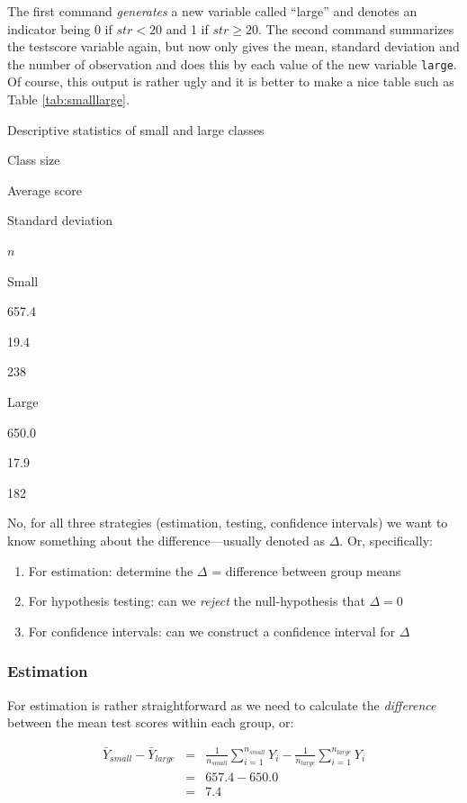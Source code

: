 \documentclass[
]{book}
\providecommand{\tightlist}{%
  \setlength{\itemsep}{0pt}\setlength{\parskip}{0pt}}
\begin{document}
The first command \emph{generates} a new variable called ``large'' and denotes an indicator being 0 if \(str < 20\) and 1 if \(str \geq 20\). The second command summarizes the testscore variable again, but now only gives the mean, standard deviation and the number of observation and does this by each value of the new variable \texttt{large}. Of course, this output is rather ugly and it is better to make a nice table such as Table \ref{tab:smalllarge}.

\label{tab:smalllarge}Descriptive statistics of small and large classes

Class size

Average score

Standard deviation

\(n\)

Small

657.4

19.4

238

Large

650.0

17.9

182

No, for all three strategies (estimation, testing, confidence intervals) we want to know something about the difference---usually denoted as \(\Delta\). Or, specifically:

\begin{enumerate}
\def\labelenumi{\arabic{enumi}.}
\tightlist
\item
  For estimation: determine the \(\Delta\) = difference between group means
\item
  For hypothesis testing: can we \emph{reject} the null-hypothesis that \(\Delta = 0\)
\item
  For confidence intervals: can we construct a confidence interval for \(\Delta\)
\end{enumerate}

\hypertarget{estimation}{%
\subsubsection{Estimation}\label{estimation}}

For estimation is rather straightforward as we need to calculate the \emph{difference} between the mean test scores within each group, or:

\begin{eqnarray}
\bar{Y}_{small} - \bar{Y}_{large} &=& \frac{1}{n_{small}} \sum_{i=1}^{n_{small}}Y_i - \frac{1}{n_{large}} \sum_{i=1}^{n_{large}} Y_i \\
&=& 657.4-650.0\\
&=&7.4
\label{eq:estimationlarge}
\end{eqnarray}
\end{document}
